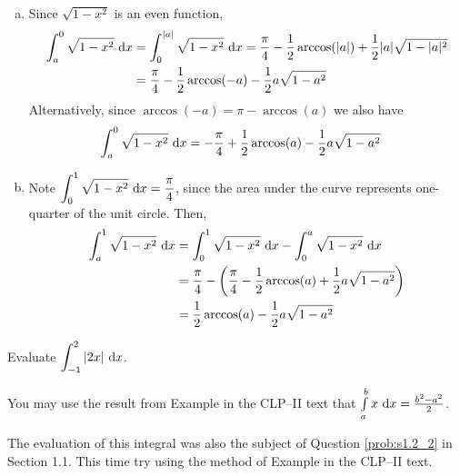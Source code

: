 \begin{solution}
\begin{enumerate}[(a)]
\item Since $\sqrt{1-x^2}$ is an even function,
\begin{align*}
\int_{a}^0 \sqrt{1-x^2}\ \mathrm{d}x 
&=\int_{0}^{|a|} \sqrt{1-x^2}\ \mathrm{d}x  = \frac{\pi}{4} - \frac{1}{2}\arccos(|a|)+\frac{1}{2}|a|\sqrt{1-|a|^2}\\
&=\frac{\pi}{4} - \frac{1}{2}\arccos(-a)-\frac{1}{2}a\sqrt{1-a^2}
\end{align*}
Alternatively, since $\arccos(-a) = \pi-\arccos(a)$ we also have
\begin{align*}
\int_{a}^0 \sqrt{1-x^2}\ \mathrm{d}x 
&=-\frac{\pi}{4} + \frac{1}{2}\arccos(a)-\frac{1}{2}a\sqrt{1-a^2}
\end{align*}

\item Note $\displaystyle\int_{0}^1 \sqrt{1-x^2}\ \mathrm{d}x=\frac{\pi}{4}$, since the area under the curve represents one-quarter of the unit circle. Then,
\begin{align*}\displaystyle\int_{a}^1 \sqrt{1-x^2}\ \mathrm{d}x&=
\displaystyle\int_{0}^1 \sqrt{1-x^2}\ \mathrm{d}x-
\displaystyle\int_{0}^a \sqrt{1-x^2}\ \mathrm{d}x\\
&=\frac{\pi}{4}-\left(\frac{\pi}{4} - \frac{1}{2}\arccos(a)+\frac{1}{2}a\sqrt{1-a^2}\right)\\
&=\frac{1}{2}\arccos(a)-\frac{1}{2}a\sqrt{1-a^2}
\end{align*}
\end{enumerate}

\end{solution}



\begin{Mquestion}[M105 2013A]\label{prob:s1.2_2}
Evaluate ${\displaystyle\int_{-1}^2 |2x|\ \dee{x}}$.

You may use the result from  Example   in the CLP--II text
that
$
\int\limits_a^b x\ \dee{x}=\frac{b^2-a^2}{2}
$.

\end{Mquestion}

\begin{hint}
The evaluation of this integral was also the subject of Question
\ref{prob:s1.2_2} in Section 1.1. This time try using the method
of Example  in the
CLP--II text.
\end{hint}

